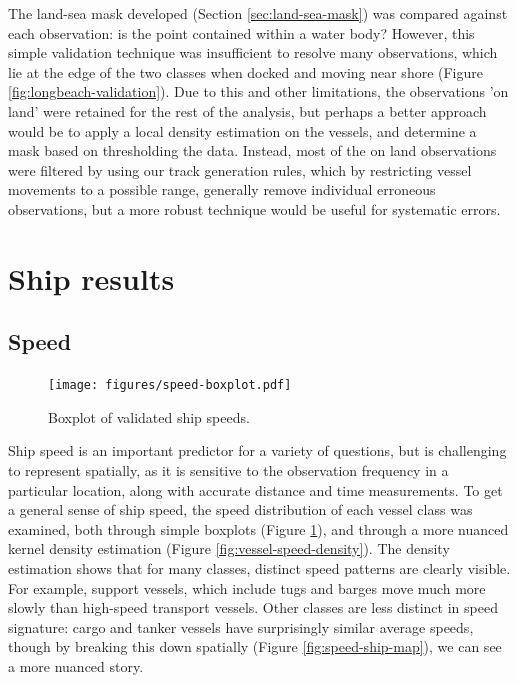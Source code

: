 The land-sea mask developed (Section \ref{sec:land-sea-mask}) was compared against each observation: is the point contained within a water body? However, this simple validation technique was insufficient to resolve many observations, which lie at the edge of the two classes when docked %
 and moving near shore %
(Figure \ref{fig:longbeach-validation}). Due to this and other limitations, the observations 'on land' were retained for the rest of the analysis, but perhaps a better approach would be to apply a local density estimation on the vessels, and determine a mask based on thresholding the data. Instead, most of the on land observations were filtered by using our track generation rules, which by restricting vessel movements to a possible range, generally remove individual erroneous observations, but a more robust technique would be useful for systematic errors.


\section{Ship results}

\subsection{Speed}
\begin{figure}[htbp]
  \centering
  \texttt{[image: figures/speed-boxplot.pdf]}
  \caption[Validated ship speeds by class]{Boxplot of validated ship speeds.}
  \label{fig:vessel-speed-boxplot} %
\end{figure}

Ship speed is an important predictor for a variety of questions, but is challenging to represent spatially, as it is sensitive to the observation frequency in a particular location, along with accurate distance and time measurements. To get a general sense of ship speed, the speed distribution of each vessel class was examined, both through simple boxplots (Figure \ref{fig:vessel-speed-boxplot}), and through a more nuanced kernel density estimation (Figure \ref{fig:vessel-speed-density}). The density estimation shows that for many classes, distinct speed patterns are clearly visible. For example, support vessels, which include tugs and barges move much more slowly than high-speed transport vessels. Other classes are less distinct in speed signature: cargo and tanker vessels have surprisingly similar average speeds, though by breaking this down spatially (Figure \ref{fig:speed-ship-map}), we can see a more nuanced story.

